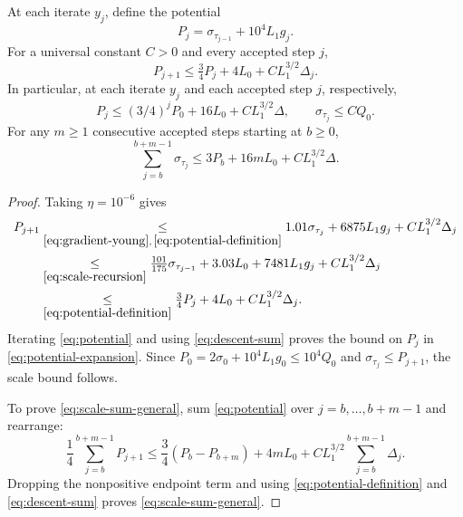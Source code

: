 \begin{proposition}\label{prop:potential}
At each iterate $y_j$, define the potential
\begin{equation}\label{eq:potential-definition}
 P_j=\sigma_{\tau_{j-1}}+10^4L_1g_j.
\end{equation}
For a universal constant $C>0$ and every accepted step $j$,
\begin{equation}\label{eq:potential}
 P_{j+1}\le\tfrac34P_j+4L_0+CL_1^{3/2}\Delta_j.
\end{equation}
In particular, at each iterate $y_j$ and each accepted step $j$, respectively,
\begin{equation}\label{eq:potential-expansion}
 P_j\le(3/4)^jP_0+16L_0+CL_1^{3/2}\Delta,
 \qquad \sigma_{\tau_j}\le CQ_0.
\end{equation}
For any $m\ge1$ consecutive accepted steps starting at $b\ge0$,
\begin{equation}\label{eq:scale-sum-general}
 \sum_{j=b}^{b+m-1}\sigma_{\tau_j}
 \le3P_b+16mL_0+CL_1^{3/2}\Delta.
\end{equation}
\end{proposition}
\begin{proof}
Taking $\eta=10^{-6}$ gives
\[
 \begin{aligned}
 P_{j+1}
 &\underset{\eqref{eq:gradient-young},\,\eqref{eq:potential-definition}}{\le}
       1.01\sigma_{\tau_j}+6875L_1g_j+CL_1^{3/2}\Delta_j\\
 &\underset{\eqref{eq:scale-recursion}}{\le}\tfrac{101}{175}\sigma_{\tau_{j-1}}
          +3.03L_0+7481L_1g_j+CL_1^{3/2}\Delta_j\\
 &\underset{\eqref{eq:potential-definition}}{\le}
       \tfrac34P_j+4L_0+CL_1^{3/2}\Delta_j.
 \end{aligned}
\]
Iterating \eqref{eq:potential} and using \eqref{eq:descent-sum}
proves the bound on $P_j$ in \eqref{eq:potential-expansion}.
Since $P_0=2\sigma_0+10^4L_1g_0\le10^4Q_0$ and
$\sigma_{\tau_j}\le P_{j+1}$, the scale bound follows.

To prove \eqref{eq:scale-sum-general}, sum \eqref{eq:potential}
over $j=b,\ldots,b+m-1$ and rearrange:
\[
 \frac14\sum_{j=b}^{b+m-1}P_{j+1}
 \le\frac34(P_b-P_{b+m})+4mL_0
                         +CL_1^{3/2}\sum_{j=b}^{b+m-1}\Delta_j.
\]
Dropping the nonpositive endpoint term and using
\eqref{eq:potential-definition} and \eqref{eq:descent-sum}
proves \eqref{eq:scale-sum-general}.
\end{proof}

